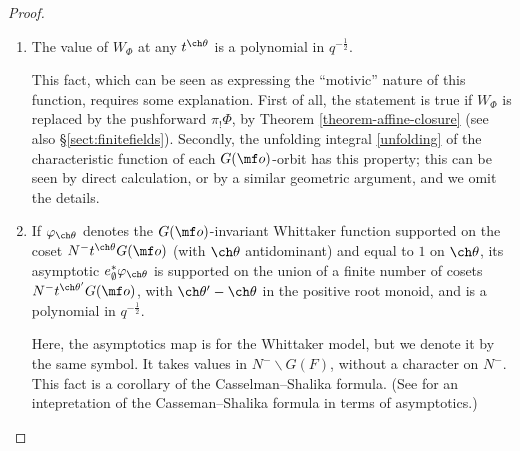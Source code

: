 \documentclass[final]{amsart}
\theoremstyle{remark}
\theoremstyle{definition}
\numberwithin{equation}{section}
\begin{document}
\begin{proof}
\begin{enumerate}
 Indeed, the support of $\Phi$ lies in $H \xi t^{\mf c_X^-} G(\mf o)$, where $\xi$ is the diagonal image of $\begin{pmatrix} 1 & 0 \\ 1 & 1\end{pmatrix}$, and from the definition \eqref{unfolding} of the unfolding map, the support of $W_{\Phi}$ will lie in $H \xi N^- t^{\mf c_X^-}  G(\mf o) = N^- \mbb G_m t^{\mf c_X^-}  G(\mf o)$, where $\mbb G_m$ is embedded as in \eqref{Gmembedding}. But a $G(\mf o)$-invariant Whittaker function with respect to a character of $N^-$ whose conductor is $\mf o$ can only be supported on antidominant elements. 
 
 When $g=1$, the integrand of \eqref{unfolding} only lies in the support of $\Phi$ when $n\in H_0\backslash N^-(\mf o)$.
 
 \item The value of $W_{\Phi}$ at any $t^{\ch\theta}$ is a polynomial in $q^{-\frac{1}{2}}$. 
 
 This fact, which can be seen as expressing the ``motivic'' nature of this function, requires some explanation. First of all, the statement is true if $W_{\Phi}$ is replaced by the pushforward $\pi_! \Phi$, by Theorem \ref{theorem-affine-closure} (see also \S \ref{sect:finitefields}). Secondly, the unfolding integral \eqref{unfolding} of the characteristic function of each $G(\mf o)$-orbit has this property; this can be seen by direct calculation, or by a similar geometric argument, and we omit the details. 
 
 \item If $\varphi_{\ch\theta}$ denotes the $G(\mf o)$-invariant Whittaker function supported on the coset $N^-t^{\ch\theta} G(\mf o)$ (with $\ch\theta$ antidominant) and equal to $1$ on $\ch\theta$, its asymptotic $e_\emptyset^* \varphi_{\ch\theta}$ is supported on the union of a finite number of cosets $N^-t^{\ch\theta'} G(\mf o)$, with $\ch\theta'-\ch\theta$ in the positive root monoid, and is a polynomial in $q^{-\frac{1}{2}}$. 
 
 Here, the asymptotics map is for the Whittaker model, but we denote it by the same symbol. It takes values in $N^-\backslash G(F)$, without a character on $N^-$. This fact is a corollary of the Casselman--Shalika formula. (See \cite[Theorem 6.8 and Example 6.4]{SaSatake} for an intepretation of the Casseman--Shalika formula in terms of asymptotics.)
 

\end{enumerate}


\end{proof}
\end{document}

